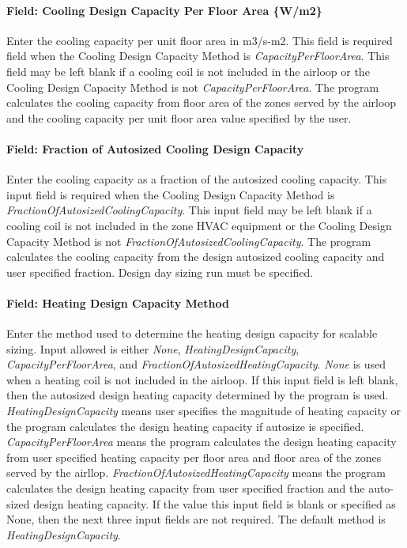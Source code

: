 \paragraph{Field: Cooling Design Capacity Per Floor Area \{W/m2\}}\label{field-cooling-design-capacity-per-floor-area-wm2-1}

Enter the cooling capacity per unit floor area in m3/s-m2. This field is required field when the Cooling Design Capacity Method is \emph{CapacityPerFloorArea}. This field may be left blank if a cooling coil is not included in the airloop or the Cooling Design Capacity Method is not \emph{CapacityPerFloorArea}. The program calculates the cooling capacity from floor area of the zones served by the airloop and the cooling capacity per unit floor area value specified by the user.

\paragraph{Field: Fraction of Autosized Cooling Design Capacity}\label{field-fraction-of-autosized-cooling-design-capacity-1}

Enter the cooling capacity as a fraction of the autosized cooling capacity. This input field is required when the Cooling Design Capacity Method is \emph{FractionOfAutosizedCoolingCapacity}. This input field may be left blank if a cooling coil is not included in the zone HVAC equipment or the Cooling Design Capacity Method is not \emph{FractionOfAutosizedCoolingCapacity}. The program calculates the cooling capacity from the design autosized cooling capacity and user specified fraction. Design day sizing run must be specified.

\paragraph{Field: Heating Design Capacity Method}\label{field-heating-design-capacity-method-1}

Enter the method used to determine the heating design capacity for scalable sizing. Input allowed is either \emph{None}, \emph{HeatingDesignCapacity}, \emph{CapacityPerFloorArea}, and \emph{FractionOfAutosizedHeatingCapacity}. \emph{None} is used when a heating coil is not included in the airloop. If this input field is left blank, then the autosized design heating capacity determined by the program is used. \emph{HeatingDesignCapacity} means user specifies the magnitude of heating capacity or the program calculates the design heating capacity if autosize is specified. \emph{CapacityPerFloorArea} means the program calculates the design heating capacity from user specified heating capacity per floor area and floor area of the zones served by the airllop. \emph{FractionOfAutosizedHeatingCapacity} means the program calculates the design heating capacity from user specified fraction and the auto-sized design heating capacity. If the value this input field is blank or specified as None, then the next three input fields are not required. The default method is \emph{HeatingDesignCapacity}.

